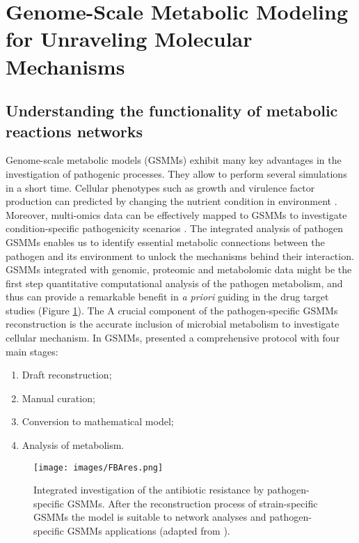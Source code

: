\documentclass{article}
\begin{document}
\section{Genome-Scale Metabolic Modeling for Unraveling Molecular Mechanisms}

\subsection{Understanding the functionality of metabolic reactions networks}

Genome-scale metabolic models (GSMMs) exhibit many key advantages in the investigation of pathogenic processes. They allow to perform several simulations in a short time. Cellular phenotypes such as growth and virulence factor production can predicted by changing the nutrient condition in environment \cite{Sertbas}. Moreover, multi-omics data can be effectively mapped to GSMMs to investigate condition-specific pathogenicity scenarios \cite{Kashaf}. The integrated analysis of pathogen GSMMs enables us to identify essential metabolic connections between the pathogen and its environment to unlock the mechanisms behind their interaction. GSMMs integrated with genomic, proteomic and metabolomic data might be the first step quantitative computational analysis of the pathogen metabolism, and thus can provide a remarkable benefit in {\it a priori} guiding in the drug target studies (Figure \ref{fig:res}). The A crucial component of the pathogen-specific GSMMs reconstruction is the accurate inclusion of microbial metabolism to investigate cellular mechanism. In GSMMs, \cite{Thiele} presented a comprehensive protocol with four main stages:

\begin{enumerate}
\item Draft reconstruction;
\item Manual curation;
\item Conversion to mathematical model;
\item Analysis of metabolism.
\end{enumerate}

\begin{figure}
\centering
\texttt{[image: images/FBAres.png]}
\caption{\label{fig:res} Integrated investigation of the antibiotic resistance by pathogen-specific GSMMs. After the reconstruction process of strain-specific GSMMs the model is suitable to network analyses and pathogen-specific GSMMs applications (adapted from \cite{Sertbas}).}
\end{figure}
\end{document}
